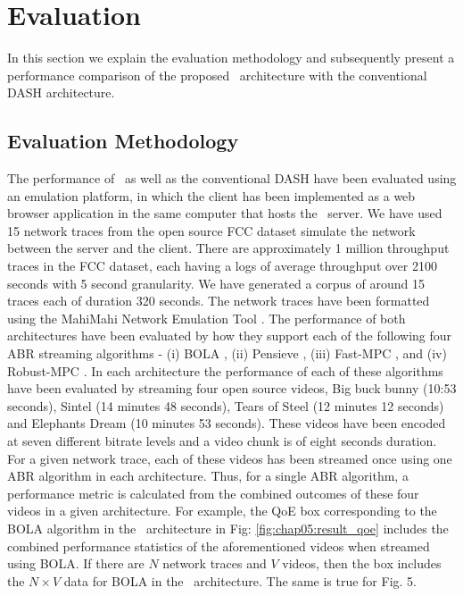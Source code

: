 \section{Evaluation}\label{sec:chap05:evaluation}
In this section we explain the evaluation methodology and subsequently present a performance comparison of the proposed \bel\ architecture with the conventional {DASH architecture}. 
\subsection{Evaluation Methodology}
The performance of \bel\ as well as the conventional \ac{DASH} have been evaluated using an emulation platform, in which the client has been implemented as a web browser application in the same computer that hosts the \servname\ server. We have used 15 network traces from the open source FCC dataset \cite{FCC2016} simulate the network between the server and the client. There are approximately 1 million throughput traces in the FCC dataset, each having a logs of average throughput over 2100 seconds with 5 second granularity. We have generated a corpus of around 15 traces each of duration 320 seconds.  The network traces have been formatted using the MahiMahi Network Emulation Tool \cite{mahimahi}. The performance of both architectures have been evaluated by how they support each of the following four \ac{ABR} streaming algorithms - (i) BOLA \cite{Spiteri2016}, (ii) Pensieve \cite{mao2017neural}, (iii) Fast-MPC \cite{yin2015control}, and (iv) Robust-MPC \cite{yin2015control}. In each architecture the performance of each of these algorithms have been evaluated by streaming four open source videos, Big buck bunny (10:53 seconds), Sintel (14 minutes 48 seconds),  Tears of Steel (12 minutes 12 seconds) and Elephants Dream (10 minutes 53 seconds). These videos have been encoded at seven different bitrate levels and a video chunk is of eight seconds duration. For a given network trace, each of these videos has been streamed once using one \ac{ABR} algorithm in each architecture. Thus, for a single ABR algorithm, a performance metric is calculated from the combined outcomes of these four videos  in a given architecture. For example, the \ac{QoE} box corresponding to the BOLA algorithm in the \bel\ architecture in Fig: \ref{fig:chap05:result_qoe} includes the combined performance statistics of the aforementioned videos when streamed using BOLA. If there are $N$ network traces and $V$ videos, then the box includes the $N\times V$ data for BOLA in the \bel\ architecture. The same is true for Fig. 5.
